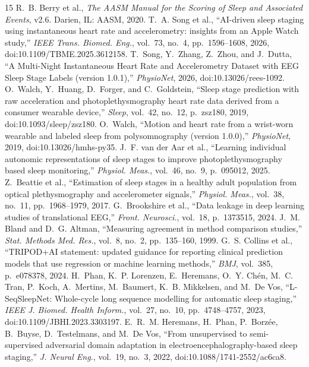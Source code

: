 \documentclass[journal]{IEEEtran}
\begin{document}
\begin{thebibliography}{15}
 R.~B. Berry et al., \textit{The AASM Manual for the Scoring of Sleep and Associated Events}, v2.6. Darien, IL: AASM, 2020.
 T.~A. Song et al., ``AI-driven sleep staging using instantaneous heart rate and accelerometry: insights from an Apple Watch study,'' \textit{IEEE Trans. Biomed. Eng.}, vol.~73, no.~4, pp.~1596--1608, 2026, doi:10.1109/TBME.2025.3612158.
 T.~Song, Y.~Zhang, Z.~Zhou, and J.~Dutta, ``A Multi-Night Instantaneous Heart Rate and Accelerometry Dataset with EEG Sleep Stage Labels (version 1.0.1),'' \textit{PhysioNet}, 2026, doi:10.13026/rees-1092.
 O.~Walch, Y.~Huang, D.~Forger, and C.~Goldstein, ``Sleep stage prediction with raw acceleration and photoplethysmography heart rate data derived from a consumer wearable device,'' \textit{Sleep}, vol.~42, no.~12, p.~zsz180, 2019, doi:10.1093/sleep/zsz180.
 O.~Walch, ``Motion and heart rate from a wrist-worn wearable and labeled sleep from polysomnography (version 1.0.0),'' \textit{PhysioNet}, 2019, doi:10.13026/hmhs-py35.
 J.~F. van der Aar et al., ``Learning individual autonomic representations of sleep stages to improve photoplethysmography based sleep monitoring,'' \textit{Physiol. Meas.}, vol.~46, no.~9, p.~095012, 2025.
 Z.~Beattie et al., ``Estimation of sleep stages in a healthy adult population from optical plethysmography and accelerometer signals,'' \textit{Physiol. Meas.}, vol.~38, no.~11, pp.~1968--1979, 2017.
 G.~Brookshire et al., ``Data leakage in deep learning studies of translational EEG,'' \textit{Front. Neurosci.}, vol.~18, p.~1373515, 2024.
 J.~M. Bland and D.~G. Altman, ``Measuring agreement in method comparison studies,'' \textit{Stat. Methods Med. Res.}, vol.~8, no.~2, pp.~135--160, 1999.
 G.~S. Collins et al., ``TRIPOD+AI statement: updated guidance for reporting clinical prediction models that use regression or machine learning methods,'' \textit{BMJ}, vol.~385, p.~e078378, 2024.
 H.~Phan, K.~P. Lorenzen, E.~Heremans, O.~Y. Ch\'en, M.~C. Tran, P.~Koch, A.~Mertins, M.~Baumert, K.~B. Mikkelsen, and M.~De Vos, ``L-SeqSleepNet: Whole-cycle long sequence modelling for automatic sleep staging,'' \textit{IEEE J. Biomed. Health Inform.}, vol.~27, no.~10, pp.~4748--4757, 2023, doi:10.1109/JBHI.2023.3303197.
 E.~R.~M. Heremans, H.~Phan, P.~Borz\'ee, B.~Buyse, D.~Testelmans, and M.~De Vos, ``From unsupervised to semi-supervised adversarial domain adaptation in electroencephalography-based sleep staging,'' \textit{J. Neural Eng.}, vol.~19, no.~3, 2022, doi:10.1088/1741-2552/ac6ca8.

\end{thebibliography}
\end{document}
